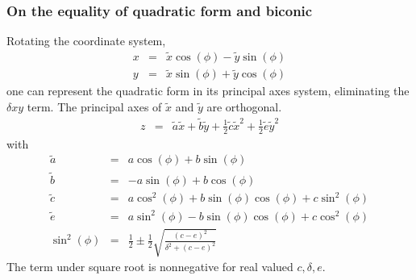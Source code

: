 \documentclass[12pt,a4paper,twoside,openright,BCOR10mm,headsepline,titlepage,abstracton,chapterprefix,final]{scrreprt}
\begin{document}
\subsubsection{On the equality of quadratic form and biconic}
Rotating the coordinate system,
\begin{eqnarray}
 x &=& \tilde{x} \cos(\phi) - \tilde{y} \sin(\phi) \\
 y &=& \tilde{x} \sin(\phi) + \tilde{y} \cos(\phi)
\end{eqnarray}
one can represent the quadratic form in its principal axes system, eliminating the $\delta x y$ term. 
The principal axes of $\tilde{x}$ and $\tilde{y}$ are orthogonal.
\begin{eqnarray}
 z &=& \tilde{a} \tilde{x} + \tilde{b} \tilde{y} + \frac{1}{2} \tilde{c} \tilde{x}^2 + \frac{1}{2} \tilde{e} \tilde{y}^2
\end{eqnarray}
with
\begin{eqnarray}
 \tilde{a} &=& a \cos(\phi) + b \sin(\phi) \\
 \tilde{b} &=& -a \sin(\phi) + b \cos(\phi) \\
 \tilde{c} &=& a \cos^2(\phi) + b \sin(\phi) \cos(\phi) + c \sin^2(\phi) \\
 \tilde{e} &=& a \sin^2(\phi) - b \sin(\phi) \cos(\phi) + c \cos^2(\phi) \\
 \sin^2(\phi) &=& \frac{1}{2} \pm \frac{1}{2} \sqrt{ \frac{(c-e)^2}{\delta^2 + (c-e)^2 } }
\end{eqnarray}
The term under square root is nonnegative for real valued $c,\delta,e$. 
\end{document}

